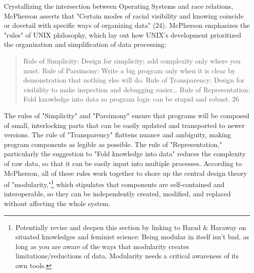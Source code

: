 \documentclass[11pt]{article}
\begin{document}
Crystallizing the intersection between Operating Systems and race
relations, McPherson asserts that "Certain modes of racial visibility
and knowing coincide or dovetail with specific ways of organizing
data" (24). McPherson emphasizes the "rules" of UNIX philosophy, which
lay out how UNIX's development prioritized the organization and
simplification of data processing:
\begin{quote}
Rule of Simplicity: Design for simplicity; add complexity only where
you must. Rule of Parsimony: Write a big program only when it is clear
by demonstration that nothing else will do. Rule of Transparency:
Design for visibility to make inspection and debugging easier\ldots{} Rule
of Representation: Fold knowledge into data so program logic can be
stupid and robust. 26
\end{quote}
The rules of "Simplicity" and "Parsimony" ensure that programs will be
composed of small, interlocking parts that can be easily updated and
transported to newer versions. The rule of "Transparency" flattens
nuance and ambiguity, making program components as legible as
possible. The rule of "Representation," particularly the suggestion to
"Fold knowledge into data" reduces the complexity of raw data, so that
it can be easily input into multiple processes. According to
McPherson, all of these rules work together to shore up the central
design theory of "modularity,"\footnote{Potentially revise and deepen this section by linking to Barad
\& Haraway on situated knowledges and feminist science: Being modular
in itself isn't bad, as long as you are aware of the ways that
modularity creates limitations/reductions of data. Modularity needs a
critical awareness of its own tools.} which stipulates that components
are self-contained and interoperable, so they can be independently
created, modified, and replaced without affecting the whole system.
\end{document}

